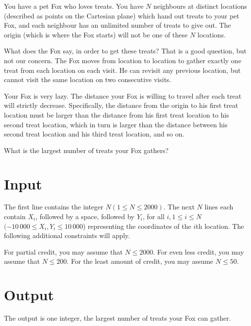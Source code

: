 
You have a pet Fox who loves treats. You have $N$ neighbours at distinct locations (described as points on the Cartesian plane) which hand out treats to your pet Fox, and each neighbour has an unlimited number of treats to give out. The origin (which is where the Fox starts) will not be one of these $N$ locations.

What does the Fox say, in order to get these treats? That is a good question, but not our concern. The Fox moves from location to location to gather exactly one treat from each location on each visit. He can revisit any previous location, but cannot visit the same location on two consecutive visits.

Your Fox is very lazy. The distance your Fox is willing to travel after each treat will strictly decrease. Specifically, the distance from the origin to his first treat location must be larger than the distance from his first treat location to his second treat location, which in turn is larger than the distance between his second treat location and his third treat location, and so on.

What is the largest number of treats your Fox gathers?

\section*{Input}
The first line contains the integer $N (1 \leq N \leq 2000)$. The next $N$ lines each contain $X_i$,
followed by a space, followed by $Y_i$, for all $i, 1 \leq i \leq N$ $(-10\,000 \leq X_i,Y_i \leq
10\,000$) representing the coordinates of the $i$th location. The following additional constraints
will apply.

For partial credit, you may assume that $N \leq 2000$. For even less credit, you may assume that $N
\leq 200$. For the least amount of credit, you may assume $N \leq 50$.


\section*{Output}
The output is one integer, the largest number of treats your Fox can gather.
